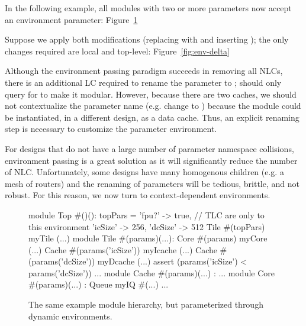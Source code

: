 In the following example, all modules with two or more parameters now accept an environment parameter:
Figure~\ref{fig:env}

Suppose we apply both modifications (replacing  with  and inserting ); the only changes required are local and top-level:
Figure~\ref{fig:env-delta}

Although the environment passing paradigm succeeds in removing all NLCs, there is an additional LC required to rename the  parameter to ; 
 should only query for  to make it modular. 
However, because there are two caches, we should not contextualize the parameter name (e.g. change  to ) because the module could be instantiated, in a different design, as a data cache. 
Thus, an explicit renaming step is necessary to customize the  parameter environment.

For designs that do not have a large number of parameter namespace collisions, environment passing is a great solution as it will significantly reduce the number of NLC. 
Unfortunately, some designs have many homogenous children (e.g. a mesh of routers) and the renaming of parameters will be tedious, brittle, and not robust. 
For this reason, we now turn to context-dependent environments.

\begin{figure}
\centering
\begin{phdl}
module Top #()():
  topPars = {'fpu?'   -> true, // TLC are only to this environment 
             'icSize' -> 256,
             'dcSize' -> 512}
  Tile #(topPars) myTile (...)
module Tile #(params)(...):
  Core  #(params) myCore (...)
  Cache #(params('icSize')) myIcache (...)
  Cache #(params('dcSize')) myDcache (...)
  assert (params('icSize') < params('dcSize')) ...
module Cache #(params)(...) : ...
module Core  #(params)(...) :
  Queue myIQ #(...) ...
\end{phdl} 
\caption{The same example module hierarchy, but parameterized through dynamic environments.}
\label{fig:env}
\end{figure}

